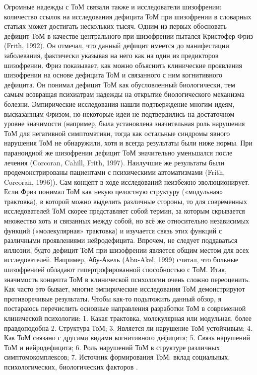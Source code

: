 Огромные надежды с ТоМ связали также и исследователи шизофрении: количество ссылок на исследования дефицита ТоМ при шизофрении в словарных статьях может достигать нескольких тысяч. Одним из первых обосновать дефицит ТоМ в качестве центрального при шизофрении пытался Кристофер Фриз (Frith, 1992). Он отмечал, что данный дефицит имеется до манифестации заболевания, фактически указывая на него как на один из предикторов шизофрении. Фриз показывает, как можно объяснить клинические проявления шизофрении на основе дефицита ТоМ и связанного с ним когнитивного дефицита. Он понимал дефицит ТоМ как обусловленный биологически, тем самым возвращая психиатрам надежды на открытие биологического механизма болезни. Эмпирические исследования нашли подтверждение многим идеям, высказанным Фризом, но некоторые идеи не подтвердились на достаточном уровне значимости (например, была установлена значительная роль нарушения ТоМ для негативной симптоматики, тогда как остальные синдромы явного нарушения ТоМ не обнаружили, хотя и всегда результаты были ниже нормы. При параноидной же шизофрении дефицит ТоМ значительно уменьшался после лечения (Corcoran, Cahill, Frith, 1997). Наилучшие же результаты были продемонстрированы пациентами с психическими автоматизмами (Frith, Corcoran, 1996)).
Сам концепт в ходе исследований неизбежно эволюционирует. Если Фриз понимал ТоМ как некую целостную структуру («модульная» трактовка), в которой можно выделить различные стороны, то для современных исследователей ТоМ скорее представляет собой термин, за которым скрывается множество хоть и связанных между собой, но всё же относительно независимых функций («молекулярная» трактовка) и изучается связь этих функций с различными проявлениями нейродефицита. 
Впрочем, не следует поддаваться иллюзии, будто дефицит ТоМ при шизофрении является общим местом для всех исследователей. Например, Абу-Акель (Abu-Akel, 1999) считал, что больные шизофренией обладают гипертрофированной способностью с ТоМ.
Итак, значимость концепта ТоМ в клинической психологии очень сложно переоценить. Как часто это бывает, многие эмпирические исследования ТоМ демонстрируют противоречивые результаты. Чтобы как-то подытожить данный обзор, я постараюсь перечислить основные направления разработки ТоМ в современной клинической психологии:
1.	Какая трактовка, молекулярная или модульная, более правдоподобна
2.	Структура ТоМ;
3.	Является ли нарушение ТоМ устойчивым;
4.	Как ТоМ связано с другими видами когнитивного дефицита;
5.	Связь нарушений ТоМ и нейродефицита;
6.	Роль нарушений ТоМ в структуре различных симптомокомплексов;
7.	Источник формирования ТоМ: вклад социальных, психологических, биологических факторов . 


